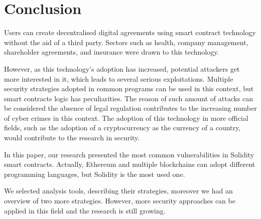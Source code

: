 \documentclass[a4paper,sigconf, language=french,
language=german, language=spanish, language=english]{acmart}
\begin{document}
\section{Conclusion}
\label{Conclusion}
Users can create decentralised digital agreements using smart contract technology without the aid of a third party.
Sectors such as health, company management, shareholder agreements, and insurance were drawn to this technology.

However, as this technology's adoption has increased, potential attackers get more interested in it, which leads to several serious exploitations. 
Multiple security strategies adopted in common programs can be used in this context, but smart contracts logic has peculiarities. 
The reason of such amount of attacks can be considered the absence of legal regulation contributes to the increasing number of cyber crimes in this context. The adoption of this technology in more official fields, such as the adoption of a cryptocurrency as the currency of a country, would contribute to the research in security.

In this paper, our research presented the most common vulnerabilities in Solidity smart contracts. Actually, Ethereum and multiple blockchains can adopt different programming languages, but Solidity is the most used one.

We selected analysis tools, describing their strategies, moreover we had an overview of two more strategies. However, more security approaches can be applied in this field and the research is still growing.




\end{document}
